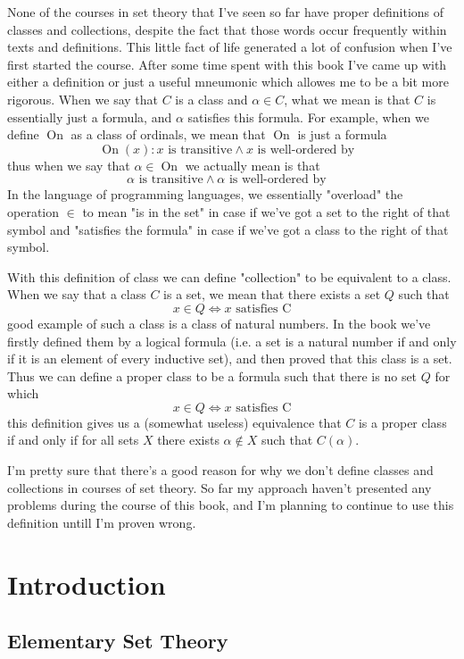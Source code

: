 \documentclass[11pt,oneside,titlepage]{book}
\DeclareMathOperator \On {On}
\DeclareMathOperator \ineq {\underline{\in}}
\begin{document}
None of the courses in set theory that I've seen so far have proper
definitions of classes and collections, despite the fact that those words
occur frequently within texts and definitions. This little fact of life
generated a lot of confusion when I've first started the course. 
After some time spent with this book
I've came up with either a definition or just a useful mneumonic which allowes me
to be a bit more rigorous. 
When we say that $C$ is a class and $\alpha \in C$, what we mean is that $C$ is essentially
just a formula, and $\alpha$ satisfies this formula. For example, when we define
$\On$ as a class of ordinals, we mean that $\On$ is just a formula
$$\On(x): x \text{ is transitive} \land x \text{ is well-ordered by } \ineq$$
thus when we say that $\alpha \in \On$ we actually mean is that
$$\alpha \text{ is transitive} \land \alpha \text{ is well-ordered by } \ineq$$
In the language of programming languages, we essentially "overload" the operation $\in$
to mean "is in the set" in case if we've got a set to the right of that symbol and
"satisfies the formula" in case if we've got a class to the right of that symbol.

With this definition of class we can define "collection" to be equivalent to a class.
When we say that a class $C$ is a set, we mean that there exists a set $Q$ such that
$$x \in Q \iff x \text{ satisfies C}$$
good example of such a class is a class of natural numbers. In the book we've firstly defined
them by a logical formula (i.e. a set is a natural number if and only if it is an element of
every inductive set), and then proved that this class is a set. 
Thus we can define a proper class to be a formula such that there is no set $Q$ for which
$$x \in Q \iff x \text{ satisfies C}$$
this definition gives us a (somewhat useless) equivalence that $C$ is
a proper class if and only if for all sets $X$ there exists $\alpha \notin X$
such that $C(\alpha)$.

I'm pretty sure that there's a good reason for why we don't define classes and collections
in courses of set theory. So far my approach haven't presented any problems during the course
of this book, and I'm planning to continue to use this definition untill I'm proven wrong.


\chapter{Introduction}

\section{Elementary Set Theory}
\end{document}
